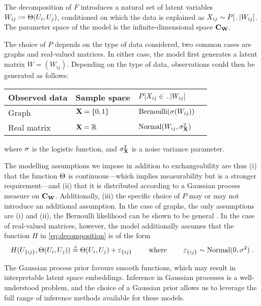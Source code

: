 The decomposition of $F$ introduces a natural set of latent variables $W_{ij}:=\Theta(U_i,U_j)$, conditioned on which the data is explained as $X_{ij}\sim P[\,.\,|W_{ij}]$. 
The parameter space of the model is the infinite-dimensional space $\mathbf{C}_{\mathbf{W}}$.

The choice of $P$ depends on the type of data considered, two common cases are graphs and 
real-valued matrices.
In either case, the model first generates a latent matrix $W=(W_{ij})$. 
Depending on the type of data, observations could then be generated as follows:
\begin{center}
  \begin{tabular}{llll} 
    Observed data & Sample space & $P[X_{ij}\in\,.\,|W_{ij}]$  \\
    \midrule
    Graph & $\mathbf{X}=\lbrace{0,1}\rbrace$  & $\mbox{\rm Bernoulli}(\sigma(W_{ij}))$
    \vspace{2pt}\\
    Real matrix & $\mathbf{X}=\mathbb{R}$  & $\mbox{Normal}(W_{ij},\sigma_{\mathbf{X}}^2)$\\
  \end{tabular}
\end{center}
where $\sigma$ is the logistic function, and $\sigma_{\mathbf{X}}^2$ is a noise variance parameter.

The modelling assumptions we impose in addition to exchangeability are thus (i) that the function $\Theta$ is continuous---which implies measurability but is a stronger requirement---and (ii) that it is distributed according to a Gaussian process measure on $\mathbf{C}_{\mathbf{W}}$.
Additionally, (iii) the specific choice of $P$ may or may not introduce an additional assumption.
In the case of graphs, the only assumptions are (i) and (ii), the Bernoulli likelihood can be shown to be general \citep[e.g.][]{Aldous2010-iw}.
In the case of real-valued matrices, however, the model additionally assumes that the function 
$H$ in \eqref{eq:decomposition} is of the form
\begin{equation}
  H(U_{\{ij\}},\Theta(U_i,U_j))\stackrel{\mbox{\tiny d}}{=} \Theta(U_i,U_j)+\varepsilon_{\{ij\}} \qquad\text{ where }\qquad \varepsilon_{\{ij\}}\sim\mbox{Normal}(0,\sigma^2)\;.
\end{equation}

The Gaussian process prior favours smooth functions, which may result in interpretable latent space embeddings.
Inference in Gaussian processes is a well-understood problem, and the choice of a Gaussian prior allows us to leverage the full range of inference methods available for these models.

